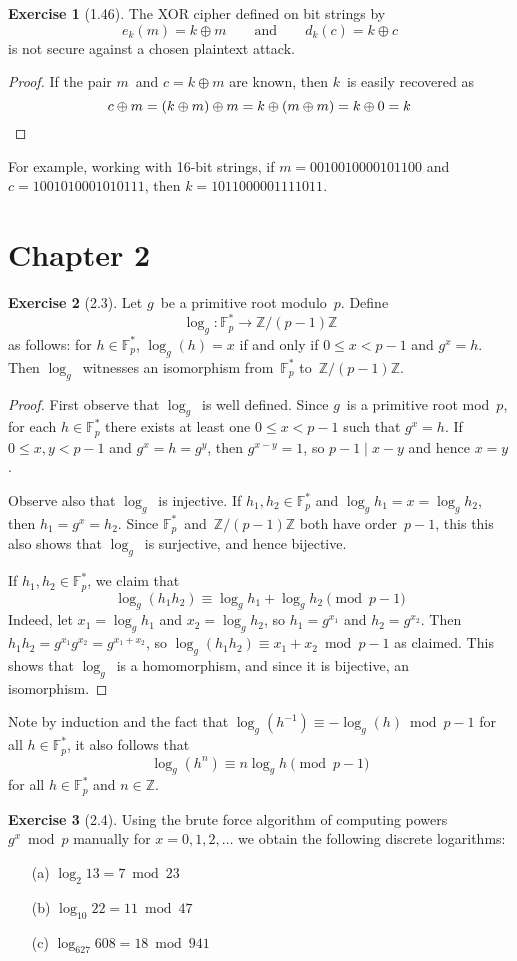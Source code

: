 \documentclass[letterpaper,12pt]{article}
\newcommand{\Z}{\mathbb{Z}}
\newcommand{\F}{\mathbb{F}}
\newcommand{\Fp}{\F_{p}}
\newcommand{\Fps}{\Fp^{*}}
\newcommand{\divides}{\mathrel{|}}
\newcommand{\xor}{\oplus}
\theoremstyle{definition}
\newtheorem*{exer}{Exercise}
\begin{document}
\begin{exer}[1.46]
The XOR cipher defined on bit strings by
\[e_k(m)=k\xor m\qquad\text{and}\qquad d_k(c)=k\xor c\]
is not secure against a chosen plaintext attack.
\end{exer}
\begin{proof}
If the pair \(m\)~and \(c=k\xor m\) are known, then \(k\)~is easily recovered as
\[c\xor m=(k\xor m)\xor m=k\xor(m\xor m)=k\xor 0=k\qedhere\]
\end{proof}
\noindent For example, working with 16-bit strings, if \(m=0010010000101100\) and \(c=1001010001010111\), then \(k=1011000001111011\).

\section*{Chapter 2}
\begin{exer}[2.3]
Let \(g\)~be a primitive root modulo~\(p\). Define
\[\log_g:\Fps\to\Z/(p-1)\Z\]
as follows: for \(h\in\Fps\), \(\log_g(h)=x\) if and only if \(0\le x<p-1\) and \(g^x=h\). Then \(\log_g\)~witnesses an isomorphism from~\(\Fps\) to~\(\Z/(p-1)\Z\).
\end{exer}
\begin{proof}
First observe that \(\log_g\)~is well defined. Since \(g\)~is a primitive root mod~\(p\), for each \(h\in\Fps\) there exists at least one \(0\le x<p-1\) such that \(g^x=h\). If \(0\le x,y<p-1\) and \(g^x=h=g^y\), then \(g^{x-y}=1\), so \(p-1\divides x-y\) and hence \(x=y\).

Observe also that \(\log_g\)~is injective. If \(h_1,h_2\in\Fps\) and \(\log_g h_1=x=\log_g h_2\), then \(h_1=g^x=h_2\). Since \(\Fps\)~and~\(\Z/(p-1)\Z\) both have order~\(p-1\), this this also shows that \(\log_g\)~is surjective, and hence bijective.

If \(h_1,h_2\in\Fps\), we claim that
\[\log_g(h_1h_2)\equiv\log_g h_1+\log_g h_2\pmod{p-1}\]
Indeed, let \(x_1=\log_g h_1\) and \(x_2=\log_g h_2\), so \(h_1=g^{x_1}\) and \(h_2=g^{x_2}\). Then \(h_1h_2=g^{x_1}g^{x_2}=g^{x_1+x_2}\), so \(\log_g(h_1h_2)\equiv x_1+x_2\bmod{p-1}\) as claimed. This shows that \(\log_g\)~is a homomorphism, and since it is bijective, an isomorphism.
\end{proof}
\noindent Note by induction and the fact that \(\log_g(h^{-1})\equiv-\log_g(h)\bmod{p-1}\) for all \(h\in\Fps\), it also follows that
\[\log_g(h^n)\equiv n\log_g h\pmod{p-1}\]
for all \(h\in\Fps\) and \(n\in\Z\).

\begin{exer}[2.4]
Using the brute force algorithm of computing powers~\(g^x\bmod p\) manually for \(x=0,1,2,\ldots\) we obtain the following discrete logarithms:
\begin{enumerate}[itemsep=0pt]
\item[(a)] \(\log_{2}13=7\bmod{23}\)
\item[(b)] \(\log_{10}22=11\bmod{47}\)
\item[(c)] \(\log_{627}608=18\bmod{941}\)
\end{enumerate}
\end{exer}
\end{document}
